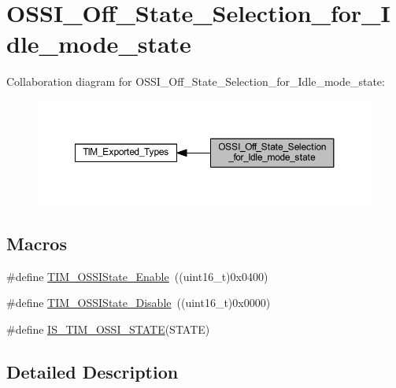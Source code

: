 \hypertarget{group___o_s_s_i___off___state___selection__for___idle__mode__state}{}\section{O\+S\+S\+I\+\_\+\+Off\+\_\+\+State\+\_\+\+Selection\+\_\+for\+\_\+\+Idle\+\_\+mode\+\_\+state}
\label{group___o_s_s_i___off___state___selection__for___idle__mode__state}
Collaboration diagram for O\+S\+S\+I\+\_\+\+Off\+\_\+\+State\+\_\+\+Selection\+\_\+for\+\_\+\+Idle\+\_\+mode\+\_\+state\+:
\nopagebreak
\begin{figure}[H]
\begin{center}
\leavevmode
\includegraphics[width=350pt]{group___o_s_s_i___off___state___selection__for___idle__mode__state}
\end{center}
\end{figure}
\subsection*{Macros}
\begin{DoxyCompactItemize}
\item 
\#define \hyperlink{group___o_s_s_i___off___state___selection__for___idle__mode__state_gaf643ec0d2edb6c8fb725d00210b3d071}{T\+I\+M\+\_\+\+O\+S\+S\+I\+State\+\_\+\+Enable}~((uint16\+\_\+t)0x0400)
\item 
\#define \hyperlink{group___o_s_s_i___off___state___selection__for___idle__mode__state_gae1962736fd5cad82e97a5814ef6758bd}{T\+I\+M\+\_\+\+O\+S\+S\+I\+State\+\_\+\+Disable}~((uint16\+\_\+t)0x0000)
\item 
\#define \hyperlink{group___o_s_s_i___off___state___selection__for___idle__mode__state_gad24fc8836152903b408239284cecfab1}{I\+S\+\_\+\+T\+I\+M\+\_\+\+O\+S\+S\+I\+\_\+\+S\+T\+A\+TE}(S\+T\+A\+TE)
\end{DoxyCompactItemize}


\subsection{Detailed Description}


